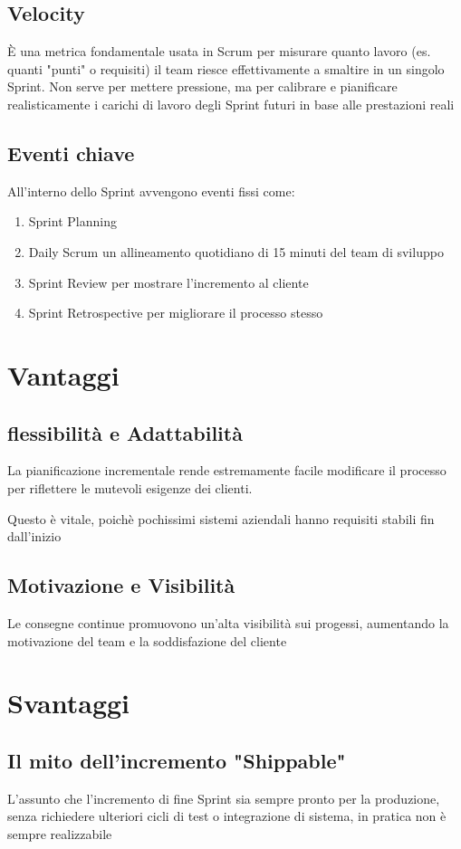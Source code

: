 \subsection{Velocity}
È una metrica fondamentale usata in Scrum per misurare quanto lavoro (es. quanti "punti" o requisiti) il team riesce effettivamente a smaltire in un singolo Sprint. Non serve per mettere pressione, ma per calibrare e pianificare realisticamente i carichi di lavoro degli Sprint futuri in base alle prestazioni reali

\subsection{Eventi chiave}
All'interno dello Sprint avvengono eventi fissi come:
\begin{enumerate}
    \item Sprint Planning
    \item Daily Scrum un allineamento quotidiano di 15 minuti del team di sviluppo
    \item Sprint Review per mostrare l'incremento al cliente
    \item Sprint Retrospective per migliorare il processo stesso
\end{enumerate}

\section{Vantaggi}
\subsection{flessibilità e Adattabilità}
La pianificazione incrementale rende estremamente facile modificare il processo per riflettere le mutevoli esigenze dei clienti.

Questo è vitale, poichè pochissimi sistemi aziendali hanno requisiti stabili fin dall'inizio

\subsection{Motivazione e Visibilità}
Le consegne continue promuovono un'alta visibilità sui progessi, aumentando la motivazione del team e la soddisfazione del cliente

\section{Svantaggi}
\subsection{Il mito dell'incremento "Shippable"}
L'assunto che l'incremento di fine Sprint sia sempre pronto per la produzione, senza richiedere ulteriori cicli di test o integrazione di sistema, in pratica non è sempre realizzabile

